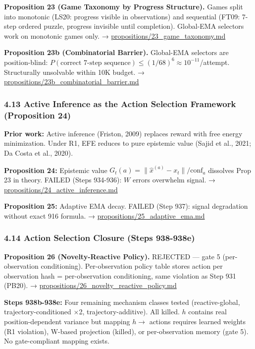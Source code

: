 \documentclass[
  11pt,
]{article}
\begin{document}
\textbf{Proposition 23 (Game Taxonomy by Progress Structure).} Games
split into monotonic (LS20: progress visible in observations) and
sequential (FT09: 7-step ordered puzzle, progress invisible until
completion). Global-EMA selectors work on monotonic games only. →
\url{propositions/23_game_taxonomy.md}

\textbf{Proposition 23b (Combinatorial Barrier).} Global-EMA selectors
are position-blind:
\(P(\text{correct 7-step sequence}) \leq (1/68)^6 \approx 10^{-11}\)/attempt.
Structurally unsolvable within 10K budget. →
\url{propositions/23b_combinatorial_barrier.md}

\subsubsection{4.13 Active Inference as the Action Selection Framework
(Proposition
24)}\label{active-inference-as-the-action-selection-framework-proposition-24}

\textbf{Prior work:} Active inference (Friston, 2009) replaces reward
with free energy minimization. Under R1, EFE reduces to pure epistemic
value (Sajid et al., 2021; Da Costa et al., 2020).

\textbf{Proposition 24:} Epistemic value
\(G_t(a) = \|\hat{x}^{(a)} - x_t\| / \text{conf}_a\) dissolves Prop 23
in theory. FAILED (Steps 934-936): \(W\) errors overwhelm signal. →
\url{propositions/24_active_inference.md}

\textbf{Proposition 25:} Adaptive EMA decay. FAILED (Step 937): signal
degradation without exact 916 formula. →
\url{propositions/25_adaptive_ema.md}

\subsubsection{4.14 Action Selection Closure (Steps
938-938e)}\label{action-selection-closure-steps-938-938e}

\textbf{Proposition 26 (Novelty-Reactive Policy).} REJECTED --- gate 5
(per-observation conditioning). Per-observation policy table stores
action per observation hash = per-observation conditioning, same
violation as Step 931 (PB20). →
\url{propositions/26_novelty_reactive_policy.md}

\textbf{Steps 938b-938e:} Four remaining mechanism classes tested
(reactive-global, trajectory-conditioned ×2, trajectory-additive). All
killed. \(h\) contains real position-dependent variance but mapping
\(h \to\) actions requires learned weights (R1 violation), W-based
projection (killed), or per-observation memory (gate 5). No
gate-compliant mapping exists.
\end{document}
